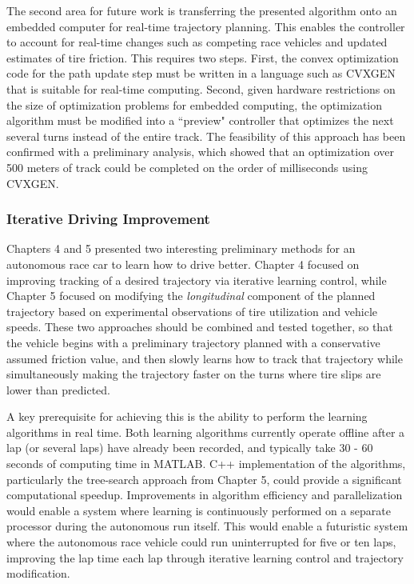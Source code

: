 The second area for future work is transferring the presented algorithm onto an embedded computer for real-time trajectory planning. This enables
the controller to account for real-time changes such as competing race vehicles and updated estimates of tire friction. This requires
two steps. First, the convex optimization code for the path update step must be written in a language such as CVXGEN \cite{boydcvxgen}
that is suitable for real-time computing. Second, given hardware restrictions on the size of optimization problems for embedded computing,
the optimization algorithm must be modified into a ``preview" controller that optimizes the next several turns instead of the entire track. 
The feasibility of this approach has been confirmed with a preliminary analysis, which showed that an optimization over 500 meters of track could be completed
on the order of milliseconds using CVXGEN. 

\subsubsection{Iterative Driving Improvement}

Chapters 4 and 5 presented two interesting preliminary methods for an autonomous race car to learn how to drive better. Chapter 4 focused
on improving tracking of a desired trajectory via iterative learning control, while Chapter 5 focused on modifying the \textit{longitudinal}
component of the planned trajectory based on experimental observations of tire utilization and vehicle speeds. These two approaches should be
combined and tested together, so that the vehicle begins with a preliminary trajectory planned with a conservative assumed friction value, and
then slowly learns how to track that trajectory while simultaneously making the trajectory faster on the turns where tire slips are lower
than predicted. 

A key prerequisite for achieving this is the ability to perform the learning algorithms in real time. Both learning algorithms currently operate
offline after a lap (or several laps) have already been recorded, and typically take 30 - 60 seconds of computing time in MATLAB. C++ implementation
of the algorithms, particularly the tree-search approach from Chapter 5, could provide a significant computational speedup. Improvements in algorithm 
efficiency and parallelization would enable a system where learning is continuously performed on a separate processor during the autonomous run itself.
This would enable a futuristic system where the autonomous race vehicle could run uninterrupted for five or ten laps, improving the lap 
time each lap through iterative learning control and trajectory modification. 

